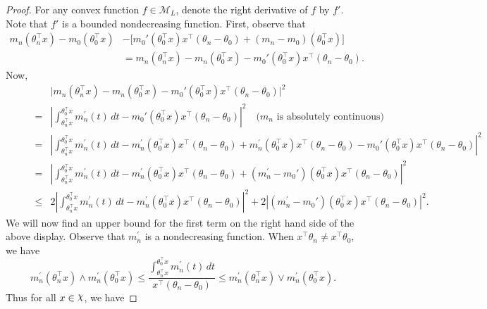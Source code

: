 \begin{proof}  For any convex function $f \in \mathcal{M}_L$,  denote the right derivative of $f$ by $f'$. Note that $f'$ is  a bounded  nondecreasing function. First, observe that
\begin{align*}
m_n(\theta_n^{\top}x)   - m_0(\theta_0^{\top}x) &- \big[m_0'(\theta_0^{\top}x)x^{\top}(\theta_n - \theta_0) + (m_n-m_0)(\theta_0^{\top}x)\big]\\
&= m_n(\theta_n^{\top}x) - m_n(\theta_0^{\top}x) - m_0'(\theta_0^{\top}x)x^{\top}(\theta_n - \theta_0).
\end{align*}
Now,
{\small \begin{align}
&\big|m_n(\theta_n^{\top}x) - m_n(\theta_0^{\top}x) - m_0'(\theta_0^{\top}x)x^{\top}(\theta_n - \theta_0)\big|^2 \nonumber\\
\;\;  \qquad ={}& \left|\int_{\theta_n^\top x}^{\theta_0^\top x} m_n^{\prime}(t)\,dt - m_0'(\theta_0^{\top}x)x^{\top}(\theta_n - \theta_0)\right|^2 \quad \text{($m_n$ is absolutely continuous)}\nonumber\\
\;\; \qquad ={}& \left|\int_{\theta_n^\top x}^{\theta_0^\top x} m_n^{\prime}(t)\,dt - m_n^{\prime}(\theta_0^{\top}x)x^{\top}(\theta_n - \theta_0)+  m_n^{\prime}(\theta_0^{\top}x)x^{\top}(\theta_n - \theta_0)- m_0'(\theta_0^{\top}x)x^{\top}(\theta_n - \theta_0)\right|^2\nonumber\\
\;\; \qquad  ={}& \left|\int_{\theta_n^\top x}^{\theta_0^\top x} m_n^{\prime}(t)\,dt - m_n^{\prime}(\theta_0^{\top}x)x^{\top}(\theta_n - \theta_0)+  (m_n^{\prime}- m_0')(\theta_0^{\top}x)x^{\top}(\theta_n - \theta_0)\right|^2\nonumber\\
\;\; \qquad \le{} & 2 \left|\int_{\theta_n^\top x}^{\theta_0^\top x} m_n^{\prime}(t)\,dt - m_n^{\prime}(\theta_0^{\top}x)x^{\top}(\theta_n - \theta_0)\right|^2+ 2\left| (m_n^{\prime}- m_0')(\theta_0^{\top}x)x^{\top}(\theta_n - \theta_0)\right|^2\label{eq:Lemma_th3_eq1}.
\end{align}}
We will now find an upper bound for the first term on the right hand side of the above display. Observe that $m_n^\prime$ is a nondecreasing function. When $x^\top\theta_n\neq x^\top\theta_0$, we have
\[m_n^{\prime}(\theta_n^\top x) \wedge  m_n^{\prime}(\theta_0^\top x) \le \frac{ \int_{\theta_n^\top x}^{\theta_0^\top x} m_n^{\prime}(t)\,dt}{x^{\top}(\theta_n - \theta_0)}  \le    m_n^{\prime}(\theta_n^\top x) \vee m_n^{\prime}(\theta_0^\top x).\] Thus for all  $x\in \rchi$, we have

\end{proof}
